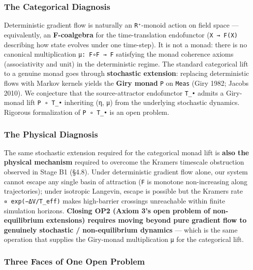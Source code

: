\documentclass[
]{article}
\begin{document}
\hypertarget{the-categorical-diagnosis}{%
\subsubsection{The Categorical
Diagnosis}\label{the-categorical-diagnosis}}

Deterministic gradient flow is naturally an \texttt{R⁺}-monoid action on
field space --- equivalently, an \textbf{F-coalgebra} for the
time-translation endofunctor (\texttt{X\ →\ F(X)} describing how state
evolves under one time-step). It is not a monad: there is no canonical
multiplication \texttt{μ:\ F∘F\ →\ F} satisfying the monad coherence
axioms (associativity and unit) in the deterministic regime. The
standard categorical lift to a genuine monad goes through
\textbf{stochastic extension}: replacing deterministic flows with Markov
kernels yields the \textbf{Giry monad} \texttt{P} on \texttt{Meas} (Giry
1982; Jacobs 2010). We conjecture that the source-attractor endofunctor
\texttt{T\_•} admits a Giry-monad lift \texttt{P\ ∘\ T\_•} inheriting
(η, μ) from the underlying stochastic dynamics. Rigorous formalization
of \texttt{P\ ∘\ T\_•} is an open problem.

\hypertarget{the-physical-diagnosis}{%
\subsubsection{The Physical Diagnosis}\label{the-physical-diagnosis}}

The same stochastic extension required for the categorical monad lift is
\textbf{also the physical mechanism} required to overcome the Kramers
timescale obstruction observed in Stage B1 (§4.8). Under deterministic
gradient flow alone, our system cannot escape any single basin of
attraction (\texttt{F} is monotone non-increasing along trajectories);
under isotropic Langevin, escape is possible but the Kramers rate
\texttt{∝\ exp(−ΔV/T\_eff)} makes high-barrier crossings unreachable
within finite simulation horizons. \textbf{Closing OP2 (Axiom 3's open
problem of non-equilibrium extensions) requires moving beyond pure
gradient flow to genuinely stochastic / non-equilibrium dynamics} ---
which is the same operation that supplies the Giry-monad multiplication
\texttt{μ} for the categorical lift.

\hypertarget{three-faces-of-one-open-problem}{%
\subsubsection{Three Faces of One Open
Problem}\label{three-faces-of-one-open-problem}}
\end{document}
